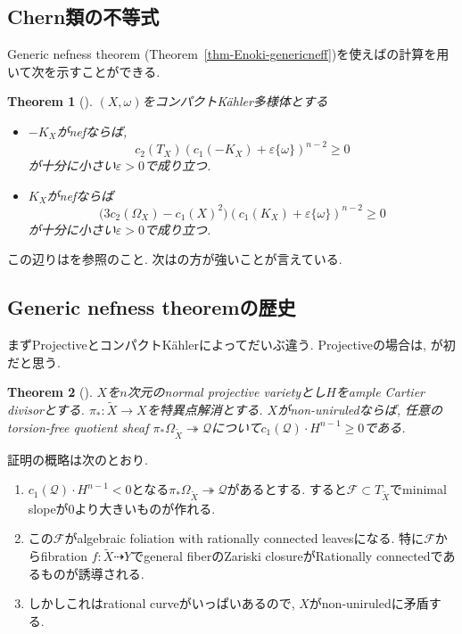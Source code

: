 \documentclass[dvipdfmx,a4paper,11pt]{article} %
\newtheorem{thm}{Theorem}[section]
\theoremstyle{definition}
\theoremstyle{remark}
\numberwithin{equation}{section}
\begin{document}
 \subsection{Chern類の不等式}
Generic nefness theorem (Theorem~\ref{thm-Enoki-genericneff})を使えば\cite{Miy87}の計算を用いて次を示すことができる. 
\begin{thm}[{\cite{Miy87, Cao13, Ou23, IM22, IMM24}}]
$(X, \omega)$をコンパクトK\"ahler多様体とする
\begin{itemize}
\item \(-K_X\)がnefならば, 
\[
c_2(T_X) (c_1(-K_X) + \varepsilon\{ \omega\})^{n-2}\geq 0
\]
が十分に小さい$\varepsilon >0$で成り立つ. 
\item \(K_X\)がnefならば
\[
\bigl(3c_2(\Omega_X)-c_1(X)^2\bigr)(c_1(K_X) + \varepsilon \{\omega\})^{n-2} \geq 0
\]
が十分に小さい$\varepsilon >0$で成り立つ. 
\end{itemize}
\end{thm}
 この辺りは\cite[Subsection 6.2, 6.3]{Iwa-Chern}を参照のこと. 
 次は\cite[Subsection 6.2, 6.3]{Iwa-Chern}の方が強いことが言えている. 

 
 \subsection{Generic nefness theoremの歴史}
まずProjectiveとコンパクトK\"ahlerによってだいぶ違う. 
Projectiveの場合は, \cite{Miy87}が初だと思う. 
\begin{thm}[{\cite[Corollary 6.4]{Miy87}}]
$X$を$n$次元のnormal projective varietyとし$H$をample Cartier divisorとする. $\pi_{*} \colon \widetilde{X} \to X$を特異点解消とする.
$X$がnon-uniruledならば, 任意のtorsion-free quotient sheaf $\pi_{*}\Omega_{\widetilde{X}} \twoheadrightarrow \mathcal{Q}$について$c_1(\mathcal{Q})\cdot H^{n-1} \geq 0$である.
\end{thm}
証明の概略は次のとおり. 
\begin{enumerate}
\item $c_1(\mathcal{Q})\cdot H^{n-1} <0$となる$\pi_{*}\Omega_{\widetilde{X}} \twoheadrightarrow \mathcal{Q}$があるとする. すると$\mathcal{F} \subset T_{\widetilde{X}}$でminimal slopeが0より大きいものが作れる. 
\item この$\mathcal{F}$がalgebraic foliation with rationally connected leavesになる. 特に$\mathcal{F}$からfibration $f \colon \widetilde{X} \dashrightarrow Y$でgeneral fiberのZariski closureがRationally connectedであるものが誘導される. 
\item しかしこれはrational curveがいっぱいあるので, $X$がnon-uniruledに矛盾する. 
\end{enumerate}
\end{document}
